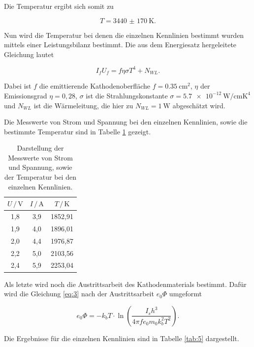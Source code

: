 Die Temperatur ergibt sich somit zu

\begin{equation*}
  T = \SI{3440(170)}{\kelvin}.
\end{equation*}

Nun wird die Temperatur bei denen die einzelnen Kennlinien bestimmt wurden mittels
einer Leistungsbilanz bestimmt. Die aus dem Energiesatz hergeleitete Gleichung lautet

\begin{equation*}
  I_f U_f = f \eta \sigma T^4 + N_{WL}.
\end{equation*}

Dabei ist $f$ die emittierende Kathodenoberfläche $f = \SI{0.35}{\centi\meter\squared}$,
$\eta$ der Emissionsgrad $\eta = 0,28$, $\sigma$ ist die Strahlungskonstante $\sigma = \SI{5.7e-12}{\watt\per\centi\meter\kelvin\tothe{4}}$
und $N_{WL}$ ist die Wärmeleitung, die hier zu $N_{WL} = \SI{1}{\watt}$ abgeschätzt wird.

Die Messwerte von Strom und Spannung bei den einzelnen Kennlinien, sowie die
bestimmte Temperatur sind in Tabelle \ref{tab:4} gezeigt.

\begin{table}[H]
  \centering
  \caption{Darstellung der Messwerte von Strom und Spannung, sowie der Temperatur bei den einzelnen Kennlinien.}
  \label{tab:4}
  \begin{tabular}{c c c}
    \toprule
    $U \, / \, \si{\volt}$ & $I \, / \, \si{\ampere}$ & $T \, / \, \si{\kelvin}$ \\
    \midrule
    1,8 & 3,9 & 1852,91 \\
    1,9 & 4,0 & 1896,01 \\
    2,0 & 4,4 & 1976,87 \\
    2,2 & 5,0 & 2103,56 \\
    2,4 & 5,9 & 2253,04 \\
    \bottomrule
  \end{tabular}
\end{table}


Als letzte wird noch die Austrittsarbeit des Kathodenmaterials bestimmt. Dafür wird
die Gleichung \ref{eq:3} nach der Austrittsarbeit $e_0 \Phi$ umgeformt

\begin{equation*}
  e_0 \Phi = - k_b T \cdot \ln \left(\frac{I_s h^3}{4 \pi f e_0 m_0 k_b^2 T^2}\right).
\end{equation*}

Die Ergebnisse für die einzelnen Kennlinien sind in Tabelle \ref{tab:5} dargestellt.

